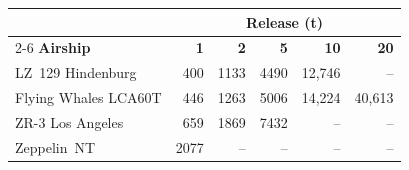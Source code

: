 \begin{tabular}{@{} l r r r r r @{}}
\toprule
& \multicolumn{5}{c}{\textbf{Release (t)}} \\
\cmidrule(l){2-6}
\textbf{Airship} & \textbf{1} & \textbf{2} & \textbf{5} & \textbf{10} & \textbf{20} \\
\midrule
LZ~129 Hindenburg & 400 & 1133 & 4490 & 12{,}746 & -- \\
Flying Whales LCA60T & 446 & 1263 & 5006 & 14{,}224 & 40{,}613 \\
ZR-3 Los Angeles & 659 & 1869 & 7432 & -- & -- \\
Zeppelin~NT & 2077 & -- & -- & -- & -- \\
\bottomrule
\end{tabular}
